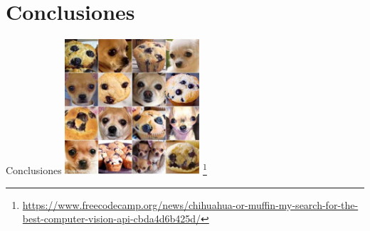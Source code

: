 \documentclass[
  24pt, %
]{beamer}
\begin{document}
\section{Conclusiones}
\begin{frame}{Conclusiones}
  \centering
  \includegraphics[width=5cm]{chihuahua}
  \footnote{\url{https://www.freecodecamp.org/news/chihuahua-or-muffin-my-search-for-the-best-computer-vision-api-cbda4d6b425d/}}
\end{frame}

%  
%  
\end{document}
